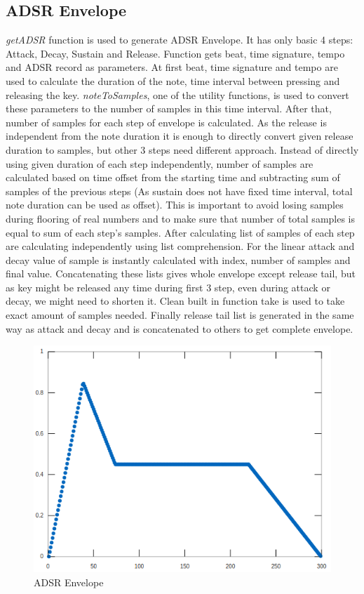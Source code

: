 \documentclass[runningheads]{llncs}
\begin{document}
\subsection{ADSR Envelope}

\textit{getADSR} function is used to generate ADSR Envelope. It has only basic 4 steps: Attack, Decay, Sustain and Release. Function gets beat, time signature, tempo and ADSR record as parameters. At first beat, time signature and tempo are used to calculate the duration of the note, time interval between pressing and releasing the key. \textit{noteToSamples}, one of the utility functions, is used to convert these parameters to the number of samples in this time interval. After that, number of samples for each step of envelope is calculated. As the release is independent from the note duration it is enough to directly convert given release duration to samples, but other 3 steps need different approach. Instead of directly using given duration of each step independently, number of samples are calculated based on time offset from the starting time and subtracting sum of samples of the previous steps (As sustain does not have fixed time interval, total note duration can be used as offset). This is important to avoid losing samples during flooring of real numbers and to make sure that number of total samples is equal to sum of each step’s samples. After calculating list of samples of each step are calculating independently using list comprehension. For the linear attack and decay value of sample is instantly calculated with index, number of samples and final value. Concatenating these lists gives whole envelope except release tail, but as key might be released any time during first 3 step, even during attack or decay, we might need to shorten it. Clean built in function take is used to take exact amount of samples needed. Finally release tail list is generated in the same way as attack and decay and is concatenated to others to get complete envelope. 

\begin{figure}[H]
\centering
\includegraphics[scale=0.3]{env1.png}
\caption{ADSR Envelope}
\end{figure}
\end{document}
